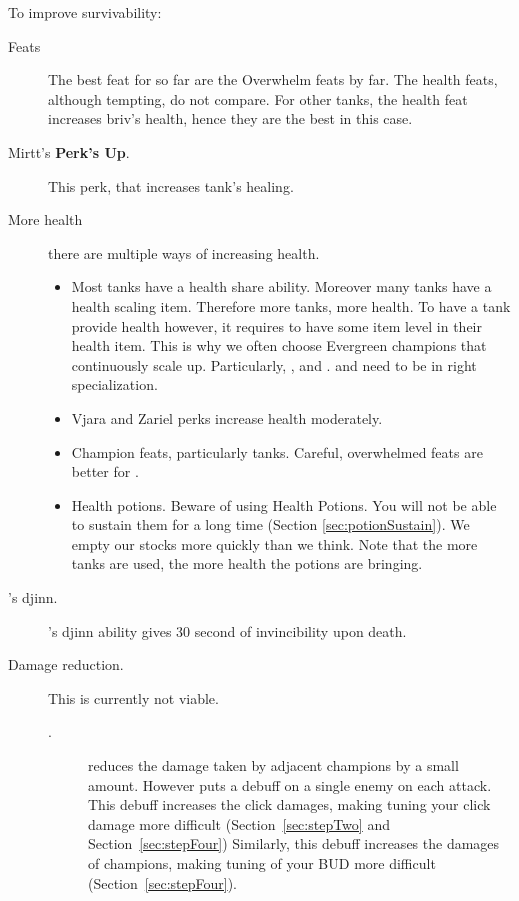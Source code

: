 \documentclass{article}
\begin{document}
To improve survivability:
\begin{description}
    \item[Feats] The best feat for \briv so far are the Overwhelm feats by far.
    The health feats, although tempting, do not compare.
    For other tanks, the health feat increases briv's health, hence they are the best in this case.
    \item[Mirtt's \textbf{Perk's Up}.] This perk, that increases tank's healing.
    \item[More health] there are multiple ways of increasing health.
        \begin{itemize}
            \item Most tanks have a health share ability.
            Moreover many tanks have a health scaling item.
            Therefore more tanks, more health.
            To have a tank provide health however, it requires to have some item level in their health item.
            This is why we often choose Evergreen champions that continuously scale up.
            Particularly, \dragonbait, \tyril and \nayeli.
            \tyril and \nayeli need to be in right specialization.
            \item Vjara and Zariel perks increase health moderately.
            \item Champion feats, particularly tanks.
            Careful, overwhelmed feats are better for \briv.
             \item Health potions.
            Beware of using Health Potions.
            You will not be able to sustain them for a long time (Section \ref{sec:potionSustain}).
            We empty our stocks more quickly than we think.
            Note that the more tanks are used, the more health the potions are bringing.
        \end{itemize}
    \item[\baeloth's djinn.] \baeloth's djinn ability gives 30 second of invincibility upon death.
    \item[Damage reduction.] This is currently not viable.
    \begin{description}
    \item[\yorven.]
    \yorven reduces the damage taken by adjacent champions by a small amount.
    However \yorven puts a debuff on a single enemy on each attack.
    This debuff increases the click damages, making tuning your click damage more difficult (Section~\ref{sec:stepTwo} and Section~\ref{sec:stepFour})
    Similarly, this debuff increases the damages of champions, making tuning of your BUD more difficult (Section~\ref{sec:stepFour}).

\end{description}
\end{description}
\end{document}
